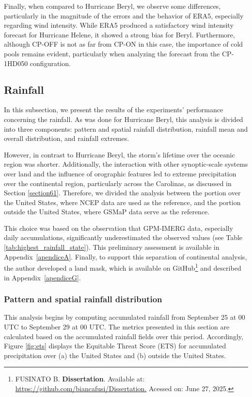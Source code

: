 Finally, when compared to Hurricane Beryl, we observe some differences, particularly in the magnitude of the errors and the behavior of ERA5, especially regarding wind intensity. While ERA5 produced a satisfactory wind intensity forecast for Hurricane Helene, it showed a strong bias for Beryl. Furthermore, although CP-OFF is not as far from CP-ON in this case, the importance of cold pools remains evident, particularly when analyzing the forecast from the CP-1HD050 configuration.

\subsection{Rainfall}

In this subsection, we present the results of the experiments' performance concerning the rainfall. As was done for Hurricane Beryl, this analysis is divided into three components: pattern and spatial rainfall distribution, rainfall mean and overall distribution, and rainfall extremes.

However, in contrast to Hurricane Beryl, the storm’s lifetime over the oceanic region was shorter. Additionally, the interaction with other synoptic-scale systems over land and the influence of orographic features led to extreme precipitation over the continental region, particularly across the Carolinas, as discussed in Section \ref{section61}. Therefore, we divided the analysis between the portion over the United States, where NCEP data are used as the reference, and the portion outside the United States, where GSMaP data serve as the reference.

This choice was based on the observation that GPM-IMERG data, especially daily accumulations, significantly underestimated the observed values (see Table  \ref{tab:highest_rainfall_state}). This preliminary assessment is available in Appendix~\ref{apendiceA}. Finally, to support this separation of continental analysis, the author developed a land mask, which is available on GitHub\footnote{FUSINATO B. \textbf{Dissertation}. Available at: \url{https://github.com/biancafusi/Dissertation.} Acessed on: June 27, 2025.} and described in Appendix~\ref{apendiceG}.

\subsubsection{Pattern and spatial rainfall distribution}

This analysis begins by computing accumulated rainfall from September 25 at 00 UTC to September 29 at 00 UTC. The metrics presented in this section are calculated based on the accumulated rainfall fields over this period. Accordingly, Figure \ref{fig:ets} displays the Equitable Threat Score (ETS) for accumulated precipitation over (a) the United States and (b) outside the United States.


